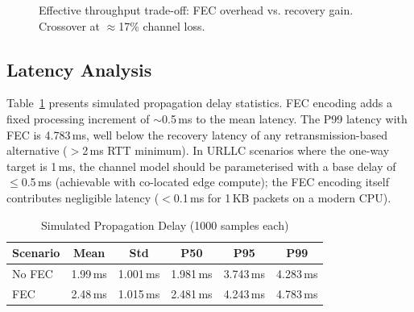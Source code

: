 \documentclass[conference]{IEEEtran}
\begin{document}
\begin{figure}[!t]
\centering
{}
\caption{Effective throughput trade-off: FEC overhead vs. recovery gain.
  Crossover at $\approx$17\% channel loss.}
\label{fig:throughput}
\end{figure}

\subsection{Latency Analysis}

Table~\ref{tab:latency} presents simulated propagation delay
statistics. FEC encoding adds a fixed processing increment of
$\sim$0.5\,ms to the mean latency. The P99 latency with FEC is
4.783\,ms, well below the recovery latency of any retransmission-based
alternative ($>$2\,ms RTT minimum). In URLLC scenarios where the
one-way target is 1\,ms, the channel model should be parameterised with
a base delay of $\leq$0.5\,ms (achievable with co-located edge compute);
the FEC encoding itself contributes negligible latency ($<$0.1\,ms for
1\,KB packets on a modern CPU).

\begin{table}[!t]
\renewcommand{\arraystretch}{1.25}
\caption{Simulated Propagation Delay (1000 samples each)}
\label{tab:latency}
\centering
\small
\begin{tabular}{lccccc}
\toprule
\textbf{Scenario} & \textbf{Mean} & \textbf{Std} &
  \textbf{P50} & \textbf{P95} & \textbf{P99} \\
\midrule
No FEC  & 1.99\,ms & 1.001\,ms & 1.981\,ms & 3.743\,ms & 4.283\,ms \\
FEC     & 2.48\,ms & 1.015\,ms & 2.481\,ms & 4.243\,ms & 4.783\,ms \\
\bottomrule
\end{tabular}
\end{table}
\end{document}
